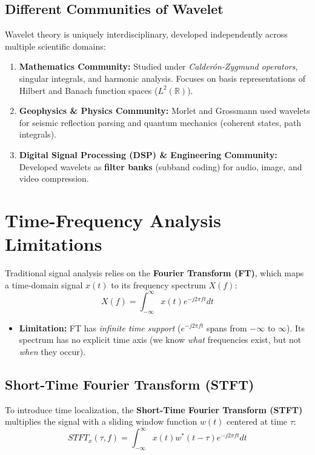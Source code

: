 \documentclass[12pt,a4paper]{article}
\begin{document}
\subsection{Different Communities of Wavelet}
Wavelet theory is uniquely interdisciplinary, developed independently across multiple scientific domains:
\begin{enumerate}[leftmargin=*, itemsep=4pt]
  \item \textbf{Mathematics Community:} Studied under \textit{Calderón-Zygmund operators}, singular integrals, and harmonic analysis. Focuses on basis representations of Hilbert and Banach function spaces ($L^2(\mathbb{R})$).
  \item \textbf{Geophysics \& Physics Community:} Morlet and Grossmann used wavelets for seismic reflection parsing and quantum mechanics (coherent states, path integrals).
  \item \textbf{Digital Signal Processing (DSP) \& Engineering Community:} Developed wavelets as \textbf{filter banks} (subband coding) for audio, image, and video compression.
\end{enumerate}

\section{Time-Frequency Analysis Limitations}

Traditional signal analysis relies on the \textbf{Fourier Transform (FT)}, which maps a time-domain signal $x(t)$ to its frequency spectrum $X(f)$:
$$X(f) = \int_{-\infty}^{\infty} x(t) e^{-j 2\pi f t} dt$$

\begin{itemize}[leftmargin=*, itemsep=3.5pt]
  \item \textbf{Limitation:} FT has \textit{infinite time support} ($e^{-j 2\pi f t}$ spans from $-\infty$ to $\infty$). Its spectrum has no explicit time axis (we know \textit{what} frequencies exist, but not \textit{when} they occur).
\end{itemize}

\subsection{Short-Time Fourier Transform (STFT)}
To introduce time localization, the \textbf{Short-Time Fourier Transform (STFT)} multiplies the signal with a sliding window function $w(t)$ centered at time $\tau$:
$$STFT_x(\tau, f) = \int_{-\infty}^{\infty} x(t) w^*(t - \tau) e^{-j 2\pi f t} dt$$
\end{document}
